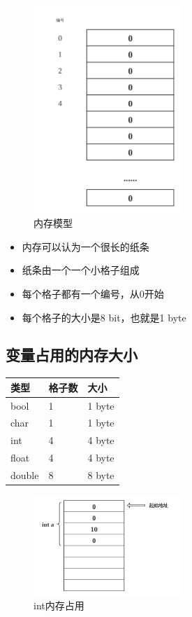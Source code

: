 \documentclass[
  paper=a4,
  ,captions=tableheading
]{scrbook}
\providecommand{\tightlist}{%
  \setlength{\itemsep}{0pt}\setlength{\parskip}{0pt}}
\begin{document}
\begin{figure}
\centering
\includegraphics[width=0.5\textwidth,height=\textheight]{./images/内存模型.png}
\caption{内存模型}
\end{figure}

\begin{itemize}
\tightlist
\item
  内存可以认为一个很长的纸条
\item
  纸条由一个一个小格子组成
\item
  每个格子都有一个编号，从0开始
\item
  每个格子的大小是8 bit，也就是1 byte
\end{itemize}

\hypertarget{ux53d8ux91cfux5360ux7528ux7684ux5185ux5b58ux5927ux5c0f}{%
\subsection{变量占用的内存大小}\label{ux53d8ux91cfux5360ux7528ux7684ux5185ux5b58ux5927ux5c0f}}

\begin{longtable}[]{@{}lll@{}}
\toprule
类型 & 格子数 & 大小 \\
\midrule
\endhead
bool & 1 & 1 byte \\
char & 1 & 1 byte \\
int & 4 & 4 byte \\
float & 4 & 4 byte \\
double & 8 & 8 byte \\
\bottomrule
\end{longtable}

\begin{figure}
\centering
\includegraphics[width=0.5\textwidth,height=\textheight]{./images/int内存占用.png}
\caption{int内存占用}
\end{figure}
\end{document}
